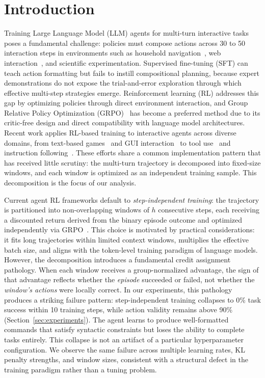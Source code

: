 \section{Introduction}
\label{sec:introduction}

Training Large Language Model (LLM) agents for multi-turn interactive tasks poses a fundamental challenge: policies must compose actions across 30 to 50 interaction steps in environments such as household navigation~\cite{kim2025reflact}, web interaction~\cite{digiRL2024}, and scientific experimentation. Supervised fine-tuning (SFT) can teach action formatting but fails to instill compositional planning, because expert demonstrations do not expose the trial-and-error exploration through which effective multi-step strategies emerge. Reinforcement learning (RL) addresses this gap by optimizing policies through direct environment interaction, and Group Relative Policy Optimization (GRPO)~\cite{shao2024deepseekmath} has become a preferred method due to its critic-free design and direct compatibility with language model architectures. Recent work applies RL-based training to interactive agents across diverse domains, from text-based games~\cite{ragen2025} and GUI interaction~\cite{digiRL2024} to tool use~\cite{spear2025} and instruction following~\cite{selfguide2026,feng2025gigpo}. These efforts share a common implementation pattern that has received little scrutiny: the multi-turn trajectory is decomposed into fixed-size windows, and each window is optimized as an independent training sample. This decomposition is the focus of our analysis.

Current agent RL frameworks default to \textit{step-independent training}: the trajectory is partitioned into non-overlapping windows of $h$ consecutive steps, each receiving a discounted return derived from the binary episode outcome and optimized independently via GRPO~\cite{ragen2025,selfguide2026}. This choice is motivated by practical considerations: it fits long trajectories within limited context windows, multiplies the effective batch size, and aligns with the token-level training paradigm of language models. However, the decomposition introduces a fundamental credit assignment pathology. When each window receives a group-normalized advantage, the sign of that advantage reflects whether the \textit{episode} succeeded or failed, not whether the \textit{window's actions} were locally correct. In our experiments, this pathology produces a striking failure pattern: step-independent training collapses to 0\% task success within 10 training steps, while action validity remains above 90\% (Section~\ref{sec:experiments}). The agent learns to produce well-formatted commands that satisfy syntactic constraints but loses the ability to complete tasks entirely. This collapse is not an artifact of a particular hyperparameter configuration. We observe the same failure across multiple learning rates, KL penalty strengths, and window sizes, consistent with a structural defect in the training paradigm rather than a tuning problem.

